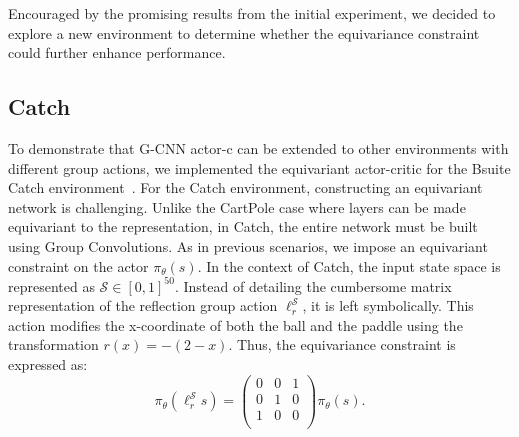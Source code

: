 Encouraged by the promising results from the initial experiment, we decided to explore a new environment to determine whether the equivariance constraint could further enhance performance.

\subsection{Catch}\label{sec:catch_ac}
To demonstrate that G-CNN actor-c can be extended to other environments with different group actions, we implemented the equivariant actor-critic for the Bsuite Catch environment~\cite{osband2020bsuite}. For the Catch environment, constructing an equivariant network is challenging. Unlike the CartPole case where layers can be made equivariant to the
representation, in Catch, the entire network must be built using Group Convolutions. As in previous scenarios, we impose an equivariant constraint on the actor $\pi_\theta(s)$.
In the context of Catch, the input state space is represented as $\mathcal{S} \in [0, 1]^{50}$. Instead of detailing the cumbersome matrix representation of the reflection group action $\ell_r^\mathcal{S}$, it is left symbolically. This action modifies the x-coordinate of both the ball and the paddle using the transformation $r(x)=-(2-x)$. Thus, the equivariance constraint is expressed as:
\begin{equation}
	\pi_\theta(\ell_r^\mathcal{S} s) = \begin{pmatrix}
		0 & 0 & 1 \\
		0 & 1 & 0 \\
		1 & 0 & 0 \\
	\end{pmatrix}\pi_\theta(s).
\end{equation}
%

